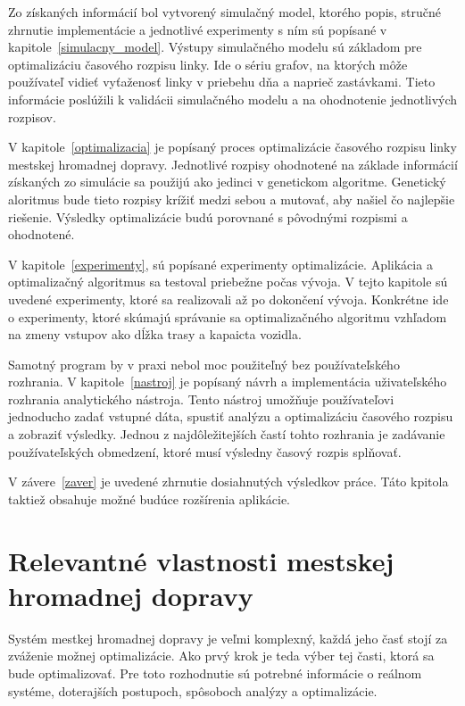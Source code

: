 Zo získaných informácií bol vytvorený simulačný model, ktorého popis, stručné zhrnutie implementácie a jednotlivé experimenty s ním sú popísané v kapitole~\ref{simulacny_model}.
Výstupy simulačného modelu sú základom pre optimalizáciu časového rozpisu linky.
Ide o sériu grafov, na ktorých môže používateľ vidieť vyťaženosť linky v priebehu dňa a naprieč zastávkami.
Tieto informácie poslúžili k validácii simulačného modelu a na ohodnotenie jednotlivých rozpisov.

V kapitole~\ref{optimalizacia} je popísaný proces optimalizácie časového rozpisu linky mestskej hromadnej dopravy.
Jednotlivé rozpisy ohodnotené na základe informácií získaných zo simulácie sa použijú ako jedinci v genetickom algoritme.
Genetický aloritmus bude tieto rozpisy krížiť medzi sebou a mutovať, aby našiel čo najlepšie riešenie.
Výsledky optimalizácie budú porovnané s pôvodnými rozpismi a ohodnotené.

V kapitole~\ref{experimenty}, sú popísané experimenty optimalizácie.
Aplikácia a optimalizačný algoritmus sa testoval priebežne počas vývoja.
V tejto kapitole sú uvedené experimenty, ktoré sa realizovali až po dokončení vývoja.
Konkrétne ide o experimenty, ktoré skúmajú správanie sa optimalizačného algoritmu vzhľadom na zmeny vstupov ako dĺžka trasy a kapaicta vozidla.

Samotný program by v praxi nebol moc použiteľný bez používateľského rozhrania.
V kapitole~\ref{nastroj} je popísaný návrh a implementácia uživateľského rozhrania analytického nástroja.
Tento nástroj umožňuje používateľovi jednoducho zadať vstupné dáta, spustiť analýzu a optimalizáciu časového rozpisu a zobraziť výsledky.
Jednou z najdôležitejších častí tohto rozhrania je zadávanie používateľských obmedzení, ktoré musí výsledny časový rozpis splňovať.

V závere~\ref{zaver} je uvedené zhrnutie dosiahnutých výsledkov práce.
Táto kpitola taktiež obsahuje možné budúce rozšírenia aplikácie.

\chapter{Relevantné vlastnosti mestskej hromadnej dopravy}\label{relevantne_vlastnosti}

Systém mestkej hromadnej dopravy je veľmi komplexný, každá jeho časť stojí za zváženie možnej optimalizácie.
Ako prvý krok je teda výber tej časti, ktorá sa bude optimalizovať.
Pre toto rozhodnutie sú potrebné informácie o reálnom systéme, doterajších postupoch, spôsoboch analýzy a optimalizácie.

